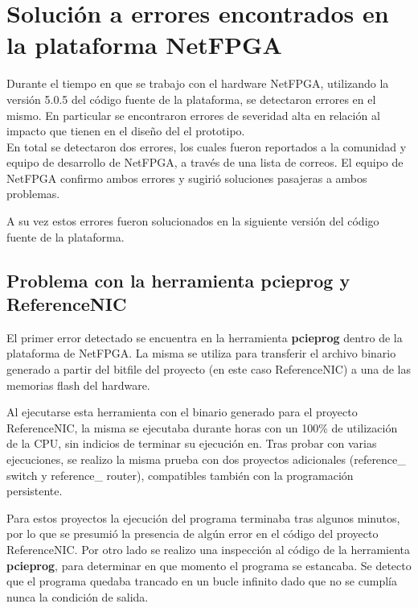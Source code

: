 \chapter{Soluci\'on a errores encontrados en la plataforma NetFPGA} 
\label{apendiceA}

Durante el tiempo en que se trabajo con el hardware NetFPGA, utilizando la versi\'on 5.0.5 del c\'odigo fuente de la plataforma, se detectaron errores en el mismo. En particular se encontraron errores de severidad alta en relaci\'on al impacto que tienen en el diseño del el prototipo.\\

En total se detectaron dos errores, los cuales fueron reportados a la comunidad y equipo de desarrollo de NetFPGA, a través de una lista de correos\citep{NetFPGABetaMailing}. El equipo de NetFPGA confirmo ambos errores y sugirió soluciones pasajeras a ambos problemas.

A su vez estos errores fueron solucionados en la siguiente versi\'on del c\'odigo fuente de la plataforma.
 
\section{Problema con la herramienta pcieprog y ReferenceNIC}
El primer error detectado se encuentra en la herramienta \textbf{pcieprog} dentro de la plataforma de NetFPGA. La misma se utiliza para transferir el archivo binario generado a partir del bitfile del proyecto (en este caso ReferenceNIC) a una de las memorias flash del hardware.

Al ejecutarse esta herramienta con el binario generado para el proyecto ReferenceNIC, la misma se ejecutaba durante horas con un 100\% de utilizaci\'on de la CPU, sin indicios de terminar su ejecución en. Tras probar con varias ejecuciones, se realizo la misma prueba con dos proyectos adicionales (reference\_ switch y reference\_ router), compatibles también con la programaci\'on persistente. 

Para estos proyectos la ejecución del programa terminaba tras algunos minutos, por lo que se presumi\'o la presencia de algún error en el c\'odigo del proyecto ReferenceNIC. Por otro lado se realizo una inspecci\'on al c\'odigo de la herramienta \textbf{pcieprog}, para determinar en que momento el programa se estancaba. Se detecto que el programa quedaba trancado en un bucle infinito dado que no se cumplía nunca la condici\'on de salida.\\ 

